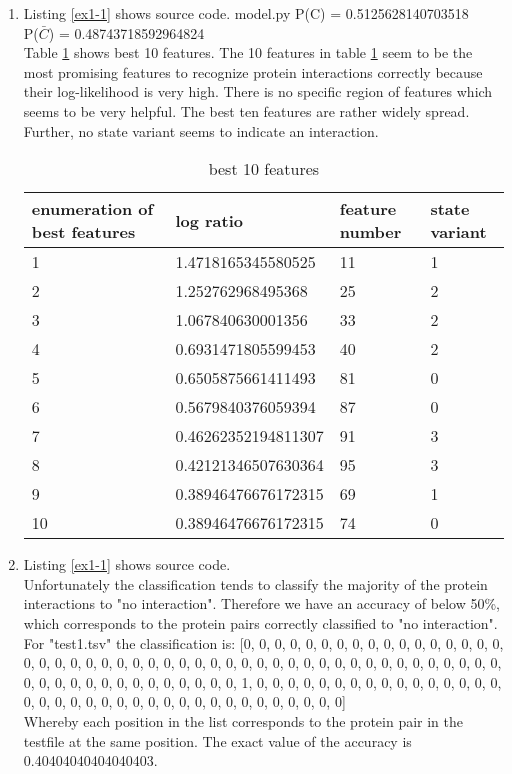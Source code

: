 \documentclass[10pt,a4paper]{article}
\begin{document}
\begin{enumerate}
\item Listing \ref{ex1-1} shows source code.
 {model.py}
P(C) = 0.5125628140703518\\
P($\bar{C}$) = 0.48743718592964824\\
Table \ref{tab1} shows best 10 features.
The 10 features in table \ref{tab1} seem to be the most promising features to recognize protein interactions correctly because their log-likelihood is very high. There is no specific region of features which seems to be very helpful. The best ten features are rather widely spread. Further, no state variant seems to indicate an interaction.
\begin{table}[b]
\label{tab1}
\begin{tabular}{llll}
enumeration of best features & log ratio & feature number & state variant\\
\hline
1 & 1.4718165345580525 & 11 & 1\\
2 & 1.252762968495368 & 25 & 2\\
3 & 1.067840630001356 & 33 & 2\\
4 & 0.6931471805599453 & 40  & 2\\
5 & 0.6505875661411493 & 81 & 0\\
6 & 0.5679840376059394 & 87 & 0\\
7 & 0.46262352194811307 & 91 & 3\\
8 & 0.42121346507630364 & 95 & 3\\
9 & 0.38946476676172315 & 69 & 1\\
10 & 0.38946476676172315 & 74 & 0\\
\end{tabular}
\caption{best 10 features}
\end{table}

\item Listing \ref{ex1-1} shows source code.\\
Unfortunately the classification tends to classify the majority of the protein interactions to "no interaction". Therefore we have an accuracy of below 50\%, which corresponds to the protein pairs correctly classified to "no interaction".\\
For "test1.tsv" the classification is: [0, 0, 0, 0, 0, 0, 0, 0, 0, 0, 0, 0, 0, 0, 0, 0, 0, 0, 0, 0, 0, 0, 0, 0, 0, 0, 0, 0, 0, 0, 0, 0, 0, 0, 0, 0, 0, 0, 0, 0, 0, 0, 0, 0, 0, 0, 0, 0, 0, 0, 0, 0, 0, 0, 0, 0, 0, 0, 0, 0, 0, 0, 1, 0, 0, 0, 0, 0, 0, 0, 0, 0, 0, 0, 0, 0, 0, 0, 0, 0, 0, 0, 0, 0, 0, 0, 0, 0, 0, 0, 0, 0, 0, 0, 0, 0, 0, 0, 0, 0]\\
Whereby each position in the list corresponds to the protein pair in the testfile at the same position. The exact value of the accuracy is 0.40404040404040403.


\end{enumerate}
\end{document}
